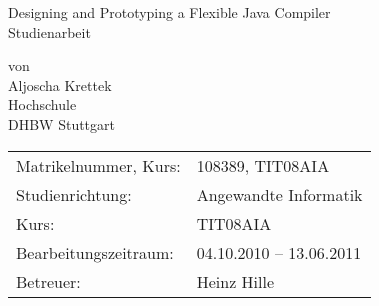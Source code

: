 \thispagestyle{empty}

\begin{titlepage}
\sffamily
	
	
\begin{center}
\hfill\vfill
\Huge{Designing and Prototyping a Flexible Java Compiler} \\[1 cm]
\bigskip
\normalsize Studienarbeit \\
\bigskip

\hfill\vfill

von\\
Aljoscha Krettek \\ [0,5 cm]
Hochschule \\
DHBW Stuttgart

\vfill\hfill

\begin{tabular}{ll}
Matrikelnummer, Kurs: & 108389, TIT08AIA \\
Studienrichtung: & Angewandte Informatik \\
Kurs: & TIT08AIA \\
Bearbeitungszeitraum: & 04.10.2010 -- 13.06.2011 \\
Betreuer: & Heinz Hille \\

\end{tabular}


%


\end{center}
\end{titlepage}   

